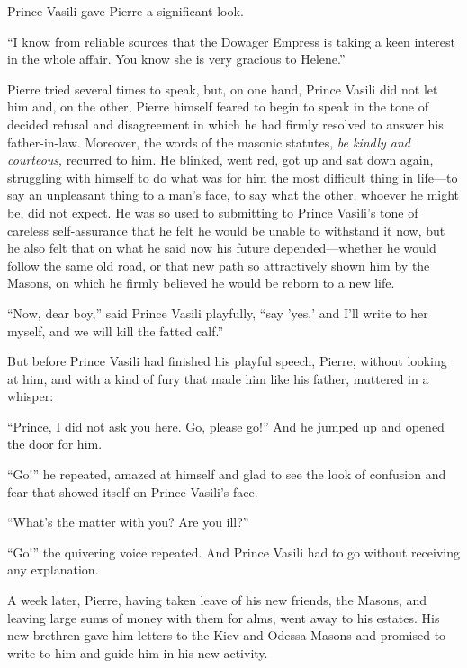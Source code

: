 Prince Vasili gave Pierre a significant look.

``I know from reliable sources that the Dowager Empress is taking
a keen interest in the whole affair. You know she is very
gracious to Helene.''

Pierre tried several times to speak, but, on one hand, Prince
Vasili did not let him and, on the other, Pierre himself feared
to begin to speak in the tone of decided refusal and disagreement
in which he had firmly resolved to answer his
father-in-law. Moreover, the words of the masonic statutes,
\emph{be kindly and courteous}, recurred to him. He blinked, went
red, got up and sat down again, struggling with himself to do
what was for him the most difficult thing in life---to say an
unpleasant thing to a man's face, to say what the other, whoever
he might be, did not expect. He was so used to submitting to
Prince Vasili's tone of careless self-assurance that he felt he
would be unable to withstand it now, but he also felt that on
what he said now his future depended---whether he would follow
the same old road, or that new path so attractively shown him by
the Masons, on which he firmly believed he would be reborn to a
new life.

``Now, dear boy,'' said Prince Vasili playfully, ``say 'yes,' and
I'll write to her myself, and we will kill the fatted calf.''

But before Prince Vasili had finished his playful speech, Pierre,
without looking at him, and with a kind of fury that made him
like his father, muttered in a whisper:

``Prince, I did not ask you here. Go, please go!'' And he jumped
up and opened the door for him.

``Go!'' he repeated, amazed at himself and glad to see the look
of confusion and fear that showed itself on Prince Vasili's face.

``What's the matter with you? Are you ill?''

``Go!'' the quivering voice repeated. And Prince Vasili had to go
without receiving any explanation.

A week later, Pierre, having taken leave of his new friends, the
Masons, and leaving large sums of money with them for alms, went
away to his estates. His new brethren gave him letters to the
Kiev and Odessa Masons and promised to write to him and guide him
in his new activity.


